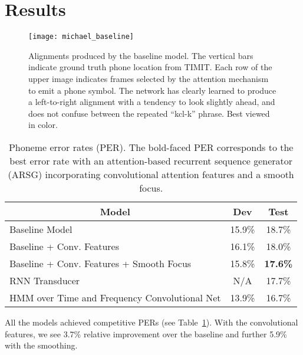 \documentclass{article}
\begin{document}
\section{Results}
\label{sec:results}

\begin{figure}[t]
  \centering
  \texttt{[image: michael\_baseline]}
\caption[Alignments produced by the baseline]{Alignments
      produced by the baseline model. The vertical bars
      indicate ground truth phone location from TIMIT. Each
      row of the upper image indicates frames selected by
      the attention mechanism to emit a phone symbol. 
The network has clearly learned to produce a left-to-right alignment with
      a tendency to look slightly ahead, and does not confuse between the
      repeated ``kcl-k'' phrase. 
      Best viewed in color.
}  
  \label{fig:ali_baseline}

  \vspace{-4mm}
\end{figure}

\begin{table}[h]
    \caption{Phoneme error rates (PER). The bold-faced PER corresponds to the
    best error rate with an attention-based recurrent sequence generator (ARSG)
    incorporating convolutional attention features and a smooth focus. }
  \label{tab:results}
\centering
\begin{tabular}{l|c|c}
\multicolumn{1}{c|}{\bf Model}  &\multicolumn{1}{c|}{\bf Dev} &\multicolumn{1}{c}{\bf Test} \\ 
  \hline 
  \hline 
Baseline Model & 15.9\% & 18.7\% \\
Baseline + Conv. Features & 16.1\% & 18.0\% \\
  Baseline + Conv. Features + Smooth Focus & 15.8\% & {\bf 17.6\%} \\
  \hline
RNN Transducer 
  \cite{graves_2013_timit} & N/A & 17.7\% \\
  \hline\hline
  HMM over Time and Frequency Convolutional Net
  \cite{toth_2014} & 13.9\% & 16.7\% 
  \end{tabular}

  \vspace{-4mm}
\end{table}

All the models achieved competitive
PERs (see Table~\ref{tab:results}). 
With the convolutional features, we see 3.7\% relative improvement over the
baseline and further 5.9\% with the smoothing. 
\end{document}
